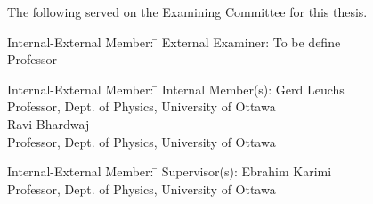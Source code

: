 \noindent The following served on the Examining Committee for this thesis.
\bigskip

\noindent
\begin{tabbing}
  Internal-External Member: \=  \kill %
  External Examiner: \>  To be define \\ %
  \> Professor \\
\end{tabbing} 
\bigskip


\noindent
\begin{tabbing}
  Internal-External Member: \=  \kill %
  Internal Member(s): \> Gerd Leuchs\\
  \> Professor, Dept. of Physics, University of Ottawa \\
  \> Ravi Bhardwaj \\
  \>  Professor, Dept. of Physics, University of Ottawa \\
\end{tabbing}
\bigskip


\noindent
\begin{tabbing}
  Internal-External Member: \=  \kill %
  Supervisor(s): \> Ebrahim Karimi\\
  \> Professor, Dept. of Physics, University of Ottawa
\end{tabbing}
\bigskip
